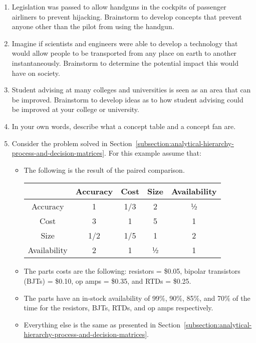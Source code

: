 \begin{enumerate}
\item
  Legislation was passed to allow handguns in the cockpits of passenger
  airliners to prevent hijacking. Brainstorm to develop concepts that
  prevent anyone other than the pilot from using the handgun.
\item
  Imagine if scientists and engineers were able to develop a technology
  that would allow people to be transported from any place on earth to
  another instantaneously. Brainstorm to determine the potential impact
  this would have on society.
\item
  Student advising at many colleges and universities is seen as an area
  that can be im­proved. Brainstorm to develop ideas as to how student
  advising could be improved at your college or university.
\item
  In your own words, describe what a concept table and a concept fan
  are.
\item
  Consider the problem solved in 
  Section~\ref{subsection:analytical-hierarchy-process-and-decision-matrices}. 
  For this example assume   that:
\begin{itemize}

\item
  The following is the result of the paired comparison.

\begin{table}
\begin{tabular}{|c|c|c|c|c|}
\hline
              &
Accuracy &
Cost &
Size &
Availability \\ \hline
Accuracy & 1 & 1/3 & 2 & ½ \\ \hline
Cost & 3 & 1 & 5 & 1 \\ \hline
Size & 1/2 & 1/5 & 1 & 2 \\ \hline
Availability & 2 & 1 & ½ & 1 \\ \hline
\end{tabular}
\end{table}


\item
  The parts costs are the following: resistors = \$0.05, bipolar
  transistors (BJTs) = \$0.10, op amps = \$0.35, and RTDs = \$0.25.
\item
  The parts have an in-stock availability of 99\%, 90\%, 85\%, and 70\%
  of the time for the re­sistors, BJTs, RTDs, and op amps respectively.
\item
  Everything else is the same as presented in 
  Section~\ref{subsection:analytical-hierarchy-process-and-decision-matrices}.
\end{itemize}


\end{enumerate}
